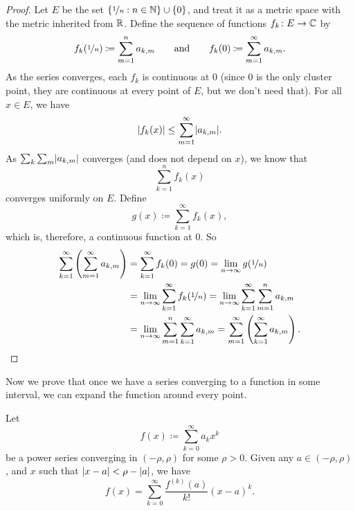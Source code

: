 \begin{proof}
Let $E$ be the set $\{ \nicefrac{1}{n} : n \in {\mathbb{N}} \} \cup \{ 0 \}$,
and treat it as a metric space with the metric inherited from ${\mathbb{R}}$.
Define the sequence of functions $f_k \colon E \to {\mathbb{C}}$
by
\begin{equation*}
f_k(\nicefrac{1}{n}) \coloneqq \sum_{m=1}^n a_{k,m}
\qquad
\text{and}
\qquad
f_k(0) \coloneqq \sum_{m=1}^\infty a_{k,m} .
\end{equation*}
As the series converges, each $f_k$ is continuous at $0$
(since 0 is the only cluster point, they are continuous at every point of
$E$, but we don't need that).
For all $x \in E$, we have
\begin{equation*}
\lvert {f_k(x)} \rvert \leq \sum_{m=1}^\infty \lvert {a_{k,m}} \rvert .
\end{equation*}
As $\sum_k \sum_m \lvert {a_{k,m}} \rvert$ converges (and does not depend on
$x$), we know that
\begin{equation*}
\sum_{k=1}^n f_k(x)
\end{equation*}
converges uniformly on $E$.  Define
\begin{equation*}
g(x) \coloneqq \sum_{k=1}^\infty f_k(x) ,
\end{equation*}
which is, therefore, a continuous function at $0$.
So
\begin{equation*}
\begin{split}
\sum_{k=1}^\infty \left( \sum_{m=1}^\infty a_{k,m} \right)
& =
\sum_{k=1}^\infty f_k(0)
= g(0)
= \lim_{n\to\infty} g(\nicefrac{1}{n}) \\
&= 
\lim_{n\to\infty}\sum_{k=1}^\infty f_k(\nicefrac{1}{n})
= 
\lim_{n\to\infty}\sum_{k=1}^\infty \sum_{m=1}^n a_{k,m} \\
&= 
\lim_{n\to\infty}\sum_{m=1}^n \sum_{k=1}^\infty a_{k,m}
= 
\sum_{m=1}^\infty \left( \sum_{k=1}^\infty a_{k,m} \right) . \qedhere
\end{split}
\end{equation*}
\end{proof}

Now we prove that once we have a series converging to a function
in some interval, we can expand the function around every point.

\begin{thm}
%
\label{thm:tayloranal}
Let
\begin{equation*}
f(x) \coloneqq \sum_{k=0}^\infty a_k x^k
\end{equation*}
be a power series converging in $(-\rho,\rho)$ for some $\rho > 0$.  Given any $a \in
(-\rho,\rho)$,
and $x$ such that $\lvert {x-a} \rvert < \rho-\lvert {a} \rvert$, we have
\begin{equation*}
f(x) =
\sum_{k=0}^\infty \frac{f^{(k)}(a)}{k!} {(x-a)}^{k} .
\end{equation*}
\end{thm}

